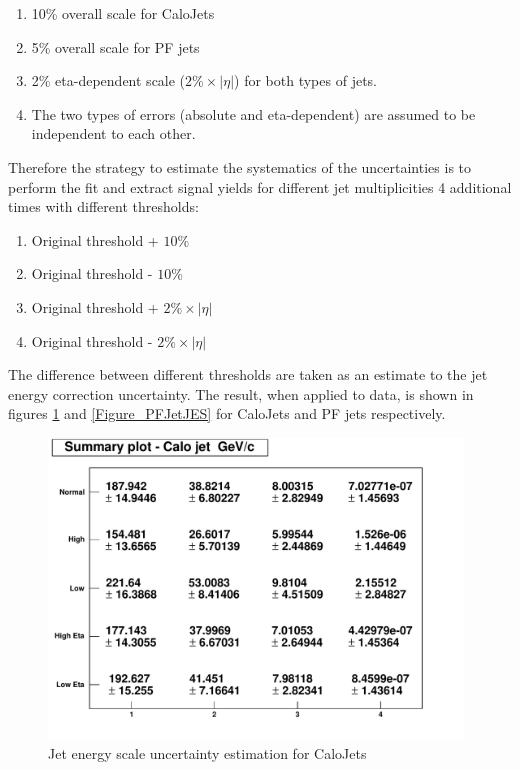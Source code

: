 \documentclass[10pt,a4paper,onecolumn]{article}
\begin{document}
\begin{enumerate}
\item 10\% overall scale for CaloJets
\item 5\% overall scale for PF jets
\item 2\% eta-dependent scale ($2\% \times |\eta|$) for both types of jets.
\item The two types of errors (absolute and eta-dependent) are assumed to be independent to each other.
\end{enumerate}

Therefore the strategy to estimate the systematics of the uncertainties is to perform the fit and extract signal yields for different jet multiplicities 4 additional times with different thresholds:

\begin{enumerate}
\item Original threshold + $10\%$
\item Original threshold - $10\%$
\item Original threshold + $2\% \times |\eta|$
\item Original threshold - $2\% \times |\eta|$
\end{enumerate}

The difference between different thresholds are taken as an estimate to the jet energy correction uncertainty.
The result, when applied to data, is shown in figures \ref{Figure_CaloJetJES} and \ref{Figure_PFJetJES} for CaloJets and PF jets respectively.

\begin{figure}
\includegraphics[width=110mm]{CaloJet_JES.pdf}
\caption{Jet energy scale uncertainty estimation for CaloJets}
\label{Figure_CaloJetJES}
\end{figure}
\end{document}
